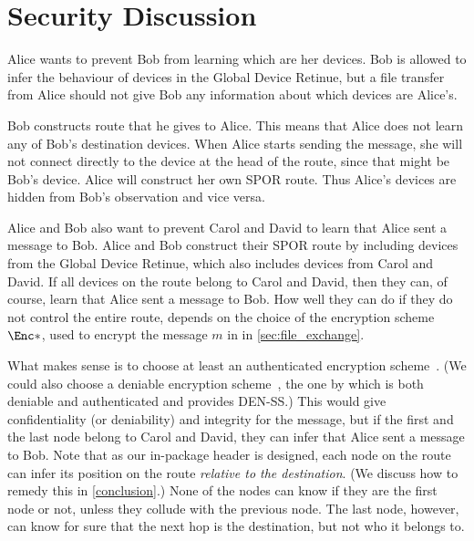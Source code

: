 \section{Security Discussion}%
\label{SecurityDiscussion}

Alice wants to prevent Bob from learning which are her devices.
Bob is allowed to infer the behaviour of devices in the Global Device Retinue, 
but a file transfer from Alice should not give Bob any information about which 
devices are Alice's.

Bob constructs  route that he gives to Alice.
This means that Alice does not learn any of Bob's destination devices.
When Alice starts sending the message, she will not connect directly to the 
device at the head of the route, since that might be Bob's device.
Alice will construct her own \ac{SPOR} route.
Thus Alice's devices are hidden from Bob's observation and vice versa.

Alice and Bob also want to prevent Carol and David to learn that Alice sent a 
message to Bob.
Alice and Bob construct their \ac{SPOR} route by including devices from the 
Global Device Retinue, which also includes devices from Carol and David.
If all devices on the route belong to Carol and David, then they can, of course, 
learn that Alice sent a message to Bob.
How well they can do if they do not control the entire route, depends on the 
choice of the encryption scheme \(\Enc*\), used to encrypt the message \(m\) in 
in \cref{sec:file_exchange}.

What makes sense is to choose at least an authenticated encryption 
scheme~\cite{AuthEncryption}.
(We could also choose a deniable encryption scheme~\cite{DeniableEncryption}, 
\eg the one by \textcite{OTPKX} which is both deniable and authenticated and 
provides \ac{DEN-SS}.)
This would give confidentiality (or deniability) and integrity for the message, 
but if the first and the last node belong to Carol and David, they can infer 
that Alice sent a message to Bob.
Note that as our in-package header is designed, each node on the route can infer 
its position on the route \emph{relative to the destination}.
(We discuss how to remedy this in \cref{conclusion}.)
None of the nodes can know if they are the first node or not, unless they 
collude with the previous node.
The last node, however, can know for sure that the next hop is the destination, 
but not who it belongs to.


